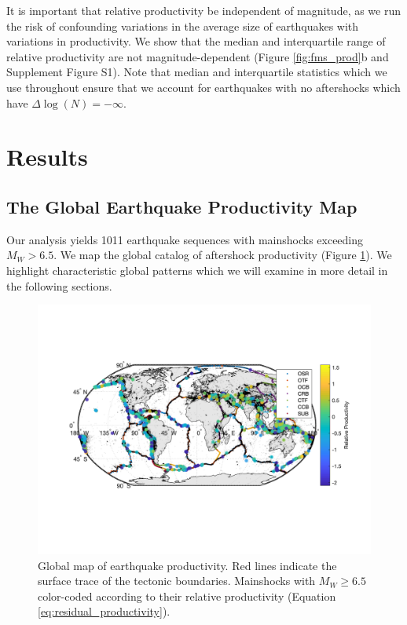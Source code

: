 \documentclass[draft, jgrga]{agujournal2018}
\begin{document}
It is important that relative productivity be independent of magnitude, as we run the risk of confounding variations in the average size of earthquakes with variations in productivity. We show that the median and interquartile range of relative productivity are not magnitude-dependent (Figure \ref{fig:fms_prod}b and Supplement Figure S1). Note that median and interquartile statistics which we use throughout ensure that we account for earthquakes with no aftershocks which have $\Delta \log(N) = -\infty$.

\section{Results}
    \subsection{The Global Earthquake Productivity Map}\label{sec:glob}

    Our analysis yields 1011 earthquake sequences with mainshocks exceeding $M_W>6.5$. We map the global catalog of aftershock productivity (Figure \ref{fig:global_res}). We highlight characteristic global patterns which we will examine in more detail in the following sections.

    \begin{figure}
    \includegraphics[width = \linewidth]{worldmap_res.png}
        \caption{Global map of earthquake productivity. Red lines indicate the surface trace of the tectonic boundaries. Mainshocks with $M_W\ge6.5$ color-coded according to their relative productivity (Equation \ref{eq:residual_productivity}).
        }
        \label{fig:global_res}
    \end{figure}
\end{document}
